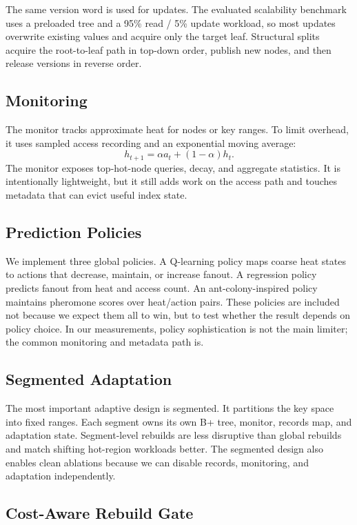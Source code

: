 \documentclass[sigconf,screen]{acmart}
\begin{document}
The same version word is used for updates.  The evaluated scalability benchmark
uses a preloaded tree and a 95\% read / 5\% update workload, so most updates
overwrite existing values and acquire only the target leaf.  Structural splits
acquire the root-to-leaf path in top-down order, publish new nodes, and then
release versions in reverse order.

\subsection{Monitoring}

The monitor tracks approximate heat for nodes or key ranges.  To limit
overhead, it uses sampled access recording and an exponential moving average:
\[
  h_{t+1} = \alpha a_t + (1-\alpha)h_t.
\]
The monitor exposes top-hot-node queries, decay, and aggregate statistics.  It
is intentionally lightweight, but it still adds work on the access path and
touches metadata that can evict useful index state.

\subsection{Prediction Policies}

We implement three global policies.  A Q-learning policy maps coarse heat
states to actions that decrease, maintain, or increase fanout.  A regression
policy predicts fanout from heat and access count.  An ant-colony-inspired
policy maintains pheromone scores over heat/action pairs.  These policies are
included not because we expect them all to win, but to test whether the result
depends on policy choice.  In our measurements, policy sophistication is not
the main limiter; the common monitoring and metadata path is.

\subsection{Segmented Adaptation}

The most important adaptive design is segmented.  It partitions the key space
into fixed ranges.  Each segment owns its own B+ tree, monitor, records map,
and adaptation state.  Segment-level rebuilds are less disruptive than global
rebuilds and match shifting hot-region workloads better.  The segmented design
also enables clean ablations because we can disable records, monitoring, and
adaptation independently.

\subsection{Cost-Aware Rebuild Gate}
\end{document}
